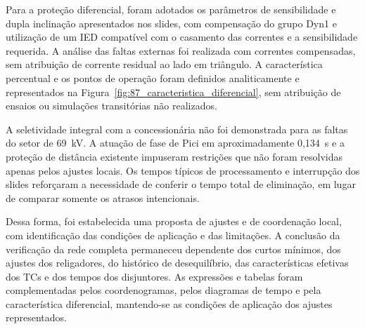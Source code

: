 Para a proteção diferencial, foram adotados os parâmetros de sensibilidade e dupla inclinação apresentados nos slides, com compensação do grupo Dyn1 e utilização de um IED compatível com o casamento das correntes e a sensibilidade requerida. A análise das faltas externas foi realizada com correntes compensadas, sem atribuição de corrente residual ao lado em triângulo. A característica percentual e os pontos de operação foram definidos analiticamente e representados na Figura~\ref{fig:87_caracteristica_diferencial}, sem atribuição de ensaios ou simulações transitórias não realizados.

A seletividade integral com a concessionária não foi demonstrada para as faltas do setor de 69~kV. A atuação de fase de Pici em aproximadamente 0,134~s e a proteção de distância existente impuseram restrições que não foram resolvidas apenas pelos ajustes locais. Os tempos típicos de processamento e interrupção dos slides reforçaram a necessidade de conferir o tempo total de eliminação, em lugar de comparar somente os atrasos intencionais.

Dessa forma, foi estabelecida uma proposta de ajustes e de coordenação local, com identificação das condições de aplicação e das limitações. A conclusão da verificação da rede completa permaneceu dependente dos curtos mínimos, dos ajustes dos religadores, do histórico de desequilíbrio, das características efetivas dos TCs e dos tempos dos disjuntores. As expressões e tabelas foram complementadas pelos coordenogramas, pelos diagramas de tempo e pela característica diferencial, mantendo-se as condições de aplicação dos ajustes representados.

